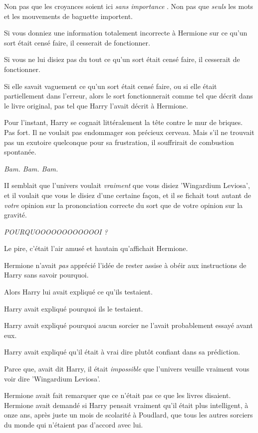 Non pas que les croyances soient ici \emph{sans importance} . Non pas que \emph{seuls}  les mots et les mouvements de baguette importent.

Si vous donniez une information totalement incorrecte à Hermione sur ce qu'un sort était censé faire, il cesserait de fonctionner.

Si vous ne lui disiez pas du tout ce qu'un sort était censé faire, il cesserait de fonctionner.

Si elle savait vaguement ce qu'un sort était censé faire, ou si elle était partiellement dans l'erreur, alors le sort fonctionnerait comme tel que décrit dans le livre original, pas tel que Harry l'avait décrit à Hermione.

Pour l'instant, Harry se cognait littéralement la tête contre le mur de briques. Pas fort. Il ne voulait pas endommager son précieux cerveau. Mais s'il ne trouvait pas un exutoire quelconque pour sa frustration, il souffrirait de combustion spontanée.

\emph{Bam. Bam. Bam.} 

II semblait que l'univers voulait \emph{vraiment}  que vous disiez 'Wingardium Leviosa', et il voulait que vous le disiez d'une certaine façon, et il se fichait tout autant de \emph{votre}  opinion sur la prononciation correcte du sort que de votre opinion sur la gravité.

\emph{POURQUOOOOOOOOOOOOI ?} 

Le pire, c'était l'air amusé et hautain qu'affichait Hermione.

Hermione n'avait \emph{pas}  apprécié l'idée de rester assise à obéir aux instructions de Harry sans savoir pourquoi.

Alors Harry lui avait expliqué ce qu'ils testaient.

Harry avait expliqué pourquoi ils le testaient.

Harry avait expliqué pourquoi aucun sorcier ne l'avait probablement essayé avant eux.

Harry avait expliqué qu'il était à vrai dire plutôt confiant dans sa prédiction.

Parce que, avait dit Harry, il était \emph{impossible}  que l'univers veuille vraiment vous voir dire 'Wingardium Leviosa'.

Hermione avait fait remarquer que ce n'était pas ce que les livres disaient. Hermione avait demandé si Harry pensait vraiment qu'il était plus intelligent, à onze ans, après juste un mois de scolarité à Poudlard, que tous les autres sorciers du monde qui n'étaient pas d'accord avec lui.

